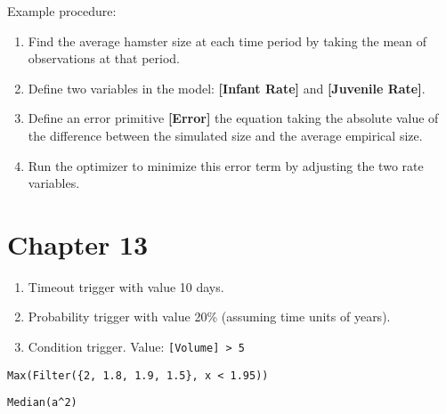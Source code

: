 \documentclass[]{memoir}
\newcommand{\p}[1]{\textbf{{[}#1{]}}}
\begin{document}
Example procedure:

\begin{enumerate}
\def\labelenumi{\arabic{enumi}.}
\itemsep1pt\parskip0pt
\item
  Find the average hamster size at each time period by taking the mean
  of observations at that period.
\item
  Define two variables in the model: \p{Infant Rate} and
  \p{Juvenile Rate}.
\item
  Define an error primitive \p{Error} the equation taking the absolute
  value of the difference between the simulated size and the average
  empirical size.
\item
  Run the optimizer to minimize this error term by adjusting the two
  rate variables.
\end{enumerate}

\section{Chapter 13}


\begin{enumerate}
\def\labelenumi{\arabic{enumi}.}
\itemsep1pt\parskip0pt
\item
  Timeout trigger with value 10 days.
\item
  Probability trigger with value 20\% (assuming time units of years).
\item
  Condition trigger. Value: \lstinline![Volume] > 5!
\end{enumerate}


\lstinline!Max(Filter({2, 1.8, 1.9, 1.5}, x < 1.95))!


\lstinline!Median(a^2)!
\end{document}
